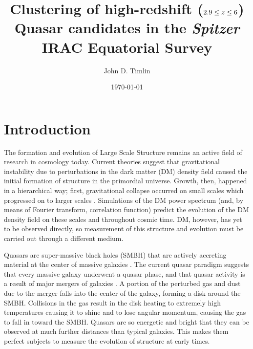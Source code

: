 \documentclass[onecolumn]{emulateapj}
\begin{document}
	
	\shortauthors{}
	
	\title{Clustering of high-redshift ($2.9 \le \MakeLowercase{z}\le6$) Quasar candidates in the \emph{Spitzer} IRAC Equatorial Survey}
	
	\author{
		John D. Timlin}
	
\date{\today}


\clearpage

\section{Introduction}

The formation and evolution of Large Scale Structure remains an active field of research in cosmology today. Current theories suggest that gravitational instability due to perturbations in the dark matter (DM) density field caused the initial formation of structure in the primordial universe. Growth, then, happened in a hierarchical way; first, gravitational collapse occurred on small scales which progressed on to larger scales \citep{Smith2003}. Simulations of the DM power spectrum (and, by means of Fourier transform, correlation function) predict the evolution of the DM density field on these scales and throughout cosmic time. DM, however, has yet to be observed directly, so measurement of this structure and evolution must be carried out through a different medium.  

Quasars are super-massive black holes (SMBH) that are actively accreting material at the center of massive galaxies \citep{LyndenBell1969}. The current quasar paradigm suggests that every massive galaxy underwent a quasar phase, and that quasar activity is a result of major mergers of galaxies \citep{Hopkins2007a}. A portion of the perturbed gas and dust due to the merger falls into the center of the galaxy, forming a disk around the SMBH. Collisions in the gas result in the disk heating to extremely high temperatures causing it to shine and to lose angular momentum, causing the gas to fall in toward the SMBH. Quasars are so energetic and bright that they can be observed at much further distances than typical galaxies. This makes them perfect subjects to measure the evolution of structure at early times.
\end{document}
